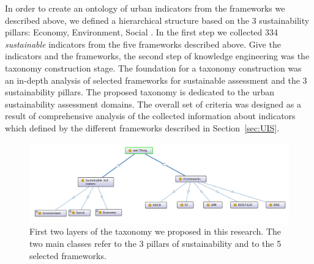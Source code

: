 \documentclass[preprint,12pt]{elsarticle}
\begin{document}
In order to create an ontology of urban indicators from the frameworks we described above, we defined a hierarchical structure based on the 3 sustainability pillars: Economy, Environment, Social \cite{kajikawa2008research}. In the  first step we collected 334 \emph{sustainable} indicators from the five frameworks described above. Give the indicators and the frameworks, the second step of knowledge engineering was the taxonomy construction stage. The foundation for a taxonomy construction was an in-depth analysis of selected frameworks for sustainable assessment and the 3 sustainability pillars. The proposed taxonomy is dedicated to the urban sustainability assessment domains.  The overall set of criteria was designed as a result of comprehensive analysis of the collected information about indicators which defined by the different frameworks described in Section~\ref{sec:UIS}.
\begin{figure}[b!]
\centering
\includegraphics[width=1\textwidth]{figures/ontologyProva.png}
\caption{First two layers of the taxonomy we proposed in this research. The two main classes refer to the 3 pillars of sustainability and to the 5 selected frameworks. }
\label{fig:ontologyProtege}
\end{figure}
\end{document}
